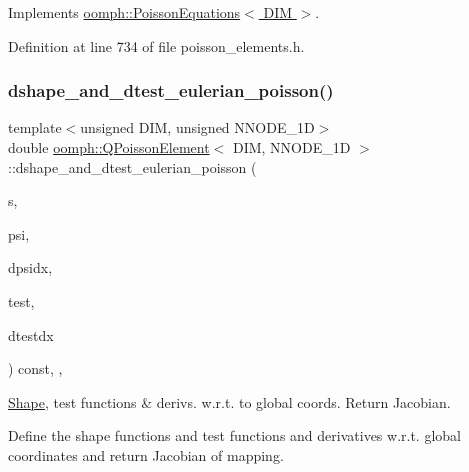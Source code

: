 Implements \hyperlink{classoomph_1_1PoissonEquations_a09f816da9c9b23fd6a308601fe536cef}{oomph\+::\+Poisson\+Equations$<$ D\+I\+M $>$}.



Definition at line 734 of file poisson\+\_\+elements.\+h.

\mbox{\label{classoomph_1_1QPoissonElement_aa3ae03aec64e427b10b791acaf36ae74}} 
\subsubsection{\texorpdfstring{dshape\+\_\+and\+\_\+dtest\+\_\+eulerian\+\_\+poisson()}{dshape\_and\_dtest\_eulerian\_poisson()}}
{\footnotesize\ttfamily template$<$unsigned D\+IM, unsigned N\+N\+O\+D\+E\+\_\+1D$>$ \\
double \hyperlink{classoomph_1_1QPoissonElement}{oomph\+::\+Q\+Poisson\+Element}$<$ D\+IM, N\+N\+O\+D\+E\+\_\+1D $>$\+::dshape\+\_\+and\+\_\+dtest\+\_\+eulerian\+\_\+poisson (\begin{DoxyParamCaption}\item[{const \hyperlink{classoomph_1_1Vector}{Vector}$<$ double $>$ \&}]{s,  }\item[{\hyperlink{classoomph_1_1Shape}{Shape} \&}]{psi,  }\item[{\hyperlink{classoomph_1_1DShape}{D\+Shape} \&}]{dpsidx,  }\item[{\hyperlink{classoomph_1_1Shape}{Shape} \&}]{test,  }\item[{\hyperlink{classoomph_1_1DShape}{D\+Shape} \&}]{dtestdx }\end{DoxyParamCaption}) const\hspace{0.3cm}{\ttfamily [inline]}, {\ttfamily [protected]}, {\ttfamily [virtual]}}



\hyperlink{classoomph_1_1Shape}{Shape}, test functions \& derivs. w.\+r.\+t. to global coords. Return Jacobian. 

Define the shape functions and test functions and derivatives w.\+r.\+t. global coordinates and return Jacobian of mapping.

